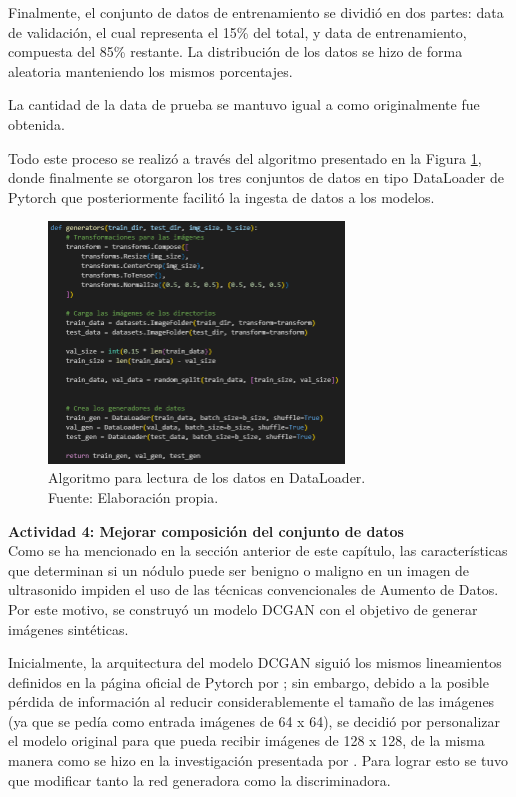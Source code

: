 Finalmente, el conjunto de datos de entrenamiento se dividió en dos partes: data de validación, el cual representa el 15\% del total, y data de entrenamiento, compuesta del 85\% restante. La distribución de los datos se hizo de forma aleatoria manteniendo los mismos porcentajes.

La cantidad de la data de prueba se mantuvo igual a como originalmente fue obtenida.

Todo este proceso se realizó a través del algoritmo presentado en la Figura \ref{4:fig110}, donde finalmente se otorgaron los tres conjuntos de datos en tipo DataLoader de Pytorch que posteriormente facilitó la ingesta de datos a los modelos.

\begin{figure}[H]
	\begin{center}
		\includegraphics[width=0.70\textwidth]{4/figures/algoritm_dataloader.PNG}
		\caption[Algoritmo para lectura de los datos en DataLoader]{Algoritmo para lectura de los datos en DataLoader. \\
		Fuente: Elaboración propia.}
		\label{4:fig110}
	\end{center}
\end{figure}

\textbf{Actividad 4: Mejorar composición del conjunto de datos}
\\
Como se ha mencionado en la sección anterior de este capítulo, las características que determinan si un nódulo puede ser benigno o maligno en un imagen de ultrasonido impiden el uso de las técnicas convencionales de Aumento de Datos. Por este motivo, se construyó un modelo DCGAN con el objetivo de generar imágenes sintéticas.

Inicialmente, la arquitectura del modelo DCGAN siguió los mismos lineamientos definidos en la página oficial de Pytorch por \cite{ws_inkawhich2024dcganpytorch}; sin embargo, debido a la posible pérdida de información al reducir considerablemente el tamaño de las imágenes (ya que se pedía como entrada imágenes de 64 x 64), se decidió por personalizar el modelo original para que pueda recibir imágenes de 128 x 128, de la misma manera como se hizo en la investigación presentada por \cite{pr_JERBI2023autoclassViTGAN}. Para lograr esto se tuvo que modificar tanto la red generadora como la discriminadora.

